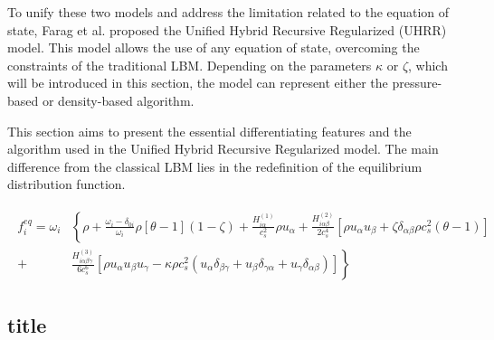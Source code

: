 To unify these two models and address the limitation related to the equation of state, Farag et al. proposed the Unified Hybrid Recursive Regularized (UHRR) model. This model allows the use of any equation of state, overcoming the constraints of the traditional LBM. Depending on the parameters $\kappa$ or $\zeta$, which will be introduced in this section, the model can represent either the pressure-based or density-based algorithm.

This section aims to present the essential differentiating features and the algorithm used in the Unified Hybrid Recursive Regularized model. The main difference from the classical LBM lies in the redefinition of the equilibrium distribution function.


\begin{align}
	\begin{split}
		f_{i}^{eq} = \omega_{i} & \left\{ \rho + \frac{\omega_{i} - \delta_{0i}}{\omega_{i}} \rho \left[ \theta - 1 \right] (1 - \zeta) + \frac{H_{i\alpha}^{(1)}}{c_{s}^{2}} \rho u_{\alpha} + \frac{H_{i\alpha\beta}^{(2)}}{2c_{s}^{4}} \left[ \rho u_{\alpha} u_{\beta} + \zeta \delta_{\alpha\beta} \rho c_{s}^{2} (\theta - 1) \right] \right.\\ 
		+ &  \left.  \frac{H_{i\alpha\beta\gamma}^{(3)}}{6c_{s}^{6}} \left[ \rho u_{\alpha} u_{\beta} u_{\gamma} - \kappa \rho c_{s}^{2} (u_{\alpha} \delta_{\beta\gamma} + u_{\beta} \delta_{\gamma\alpha} + u_{\gamma} \delta_{\alpha\beta}) \right] \right\}
	\end{split}
\end{align}

\subsection{title}

